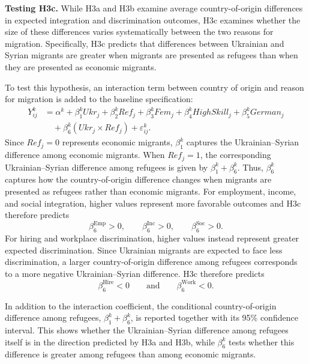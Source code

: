 \noindent\textbf{Testing H3c.} While H3a and H3b examine average country-of-origin differences in expected integration 
and discrimination outcomes, H3c examines whether the size of these differences varies systematically between the two reasons for migration. 
Specifically, H3c predicts that differences between Ukrainian and Syrian migrants are greater when migrants are 
presented as refugees than when they are presented as economic migrants. 

To test this hypothesis, an interaction term between country of origin and reason for migration is added to the baseline specification:
\begin{equation}
\begin{aligned}
Y_{ij}^{k}
&= \alpha^{k}
+ \beta_{1}^{k}Ukr_j
+ \beta_{2}^{k}Ref_j
+ \beta_{3}^{k}Fem_j
+ \beta_{4}^{k}HighSkill_j
+ \beta_{5}^{k}German_j \\
&\quad
+ \beta_{6}^{k}(Ukr_j \times Ref_j)
+ \varepsilon_{ij}^{k}.
\end{aligned}
\end{equation}
Since \(Ref_j=0\) represents economic migrants, \(\beta_{1}^{k}\) captures the Ukrainian–Syrian difference among 
economic migrants. When \(Ref_j=1\), the corresponding Ukrainian–Syrian difference among refugees is given by 
\(\beta_{1}^{k}+\beta_{6}^{k}\). Thus, \(\beta_{6}^{k}\) captures how the country-of-origin difference changes 
when migrants are presented as refugees rather than economic migrants. For employment, income, and social integration, 
higher values represent more favorable outcomes and H3c therefore predicts
$$ \beta_{6}^{\mathrm{Emp}}>0,\qquad \beta_{6}^{\mathrm{Inc}}>0,\qquad \beta_{6}^{\mathrm{Soc}}>0. $$
For hiring and workplace discrimination, higher values instead represent greater expected discrimination. 
Since Ukrainian migrants are expected to face less discrimination, a larger country-of-origin difference among refugees 
corresponds to a more negative Ukrainian–Syrian difference. H3c therefore predicts
$$ \beta_{6}^{\mathrm{Hire}}<0 \qquad\text{and}\qquad \beta_{6}^{\mathrm{Work}}<0. $$

In addition to the interaction coefficient, the conditional country-of-origin difference among refugees, 
\(\beta_{1}^{k}+\beta_{6}^{k}\), is reported together with its 95\% confidence interval. This shows whether the 
Ukrainian–Syrian difference among refugees itself is in the direction predicted by H3a and H3b, while 
\(\beta_{6}^{k}\) tests whether this difference is greater among refugees than among economic migrants.\bigskip

